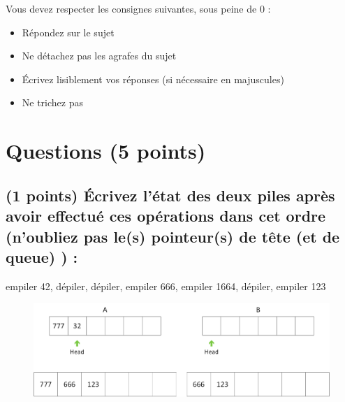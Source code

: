 \documentclass[11pt,a4paper]{article}
\begin{document}
\MakeExamTitle                   %


\bigskip
\bigskip

Vous devez respecter les consignes suivantes, sous peine de 0 :

\begin{itemize}
\item Répondez sur le sujet
\item Ne détachez pas les agrafes du sujet
\item \'Ecrivez lisiblement vos réponses (si nécessaire en majuscules)
\item Ne trichez pas
\end{itemize}

\bigskip


\section{Questions (5 points)}

\subsection{(1 points) \'Ecrivez l'état des deux piles après avoir effectué ces opérations dans cet ordre (n'oubliez pas le(s) pointeur(s) de tête (et de queue) ) : }

\bigskip

\vfill
\hspace{0pt}

\begin{center}

\begin{large}
empiler 42, dépiler, dépiler, empiler 666, empiler 1664, dépiler, empiler 123
\end{large}


\bigskip

\begin{figure}[ht!]
\centering
\centerline{  %
\includegraphics[scale=1]{img/correction_Exercice1_bis.png}
}
\end{figure}

\end{center}
\end{document}
